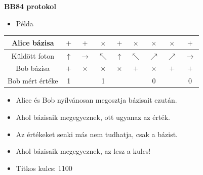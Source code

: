 \documentclass{beamer}
\begin{document}
    \begin{frame}

        \center

        \textbf{BB84 protokol}

        \begin{itemize}
            \item Példa
        \end{itemize}

        \footnotesize

        \begin{tabular}{|c|c|c|c|c|c|c|c|c|}
            \hline
            Alice bázisa
            & $+$
            & $+$
            & $\times$
            & $+$
            & $\times$
            & $\times$
            & $\times$
            & $+$\\
            \hline
            Küldött foton
            & $\uparrow$
            & $\rightarrow$
            & $\nwarrow$
            & $\uparrow$
            & $\nwarrow$
            & $\nearrow$
            & $\nearrow$
            & $\rightarrow$\\
            \hline
            Bob bázisa
            & $+$
            & $\times$
            & $\times$
            & $\times$
            & $+$
            & $\times$
            & $+$
            & $+$\\
            \hline
            Bob mért értéke
            & 1
            & 
            & 1
            & 
            & 
            & 0
            & 
            & 0\\
            \hline
        \end{tabular}

        \begin{itemize}
            \item Alice és Bob nyílvánosan megosztja bázisait ezután.
            \item Ahol bázisaik megegyeznek, ott ugyanaz az érték.
            \item Az értékeket senki más nem tudhatja, csak a bázist.
            \item Ahol bázisaik megegyeznek, az lesz a kulcs!
            \item Titkos kulcs: 1100
        \end{itemize}

    \end{frame}
\end{document}
